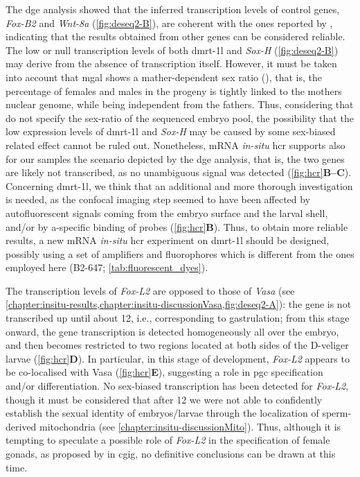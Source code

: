 The \gls{dge} analysis showed that the inferred transcription levels of control genes, \textit{Fox-B2} and \textit{Wnt-8a} (\cref{fig:deseq2-B}), are coherent with the ones reported by , indicating that the results obtained from other genes can be considered reliable. The low or null transcription levels of both \gls{dmrt-1l} and \textit{Sox-H} (\cref{fig:deseq2-B}) may derive from the absence of transcription itself. However, it must be taken into account that \gls{mgal} shows a mather-dependent sex ratio (), that is, the percentage of females and males in the progeny is tightly linked to the mother\curlyapostrophe s nuclear genome, while being independent from the father\curlyapostrophe s. Thus, considering that  do not specify the sex-ratio of the sequenced embryo pool, the possibility that the low expression levels of \gls{dmrt-1l} and \textit{Sox-H} may be caused by some sex-biased related effect cannot be ruled out. Nonetheless, mRNA \textit{in-situ} \gls{hcr} supports also for our samples the scenario depicted by the \gls{dge} analysis, that is, the two genes are likely not transcribed, as no unambiguous signal was detected (\cref{fig:hcr}\textbf{B--C}). Concerning \gls{dmrt-1l}, we think that an additional and more thorough investigation is needed, as the confocal imaging step seemed to have been affected by autofluorescent signals coming from the embryo surface and the larval shell, and/or by a-specific binding  of probes (\cref{fig:hcr}\textbf{B}). Thus, to obtain more reliable results, a new mRNA \textit{in-situ} \gls{hcr} experiment on \gls{dmrt-1l} should be designed, possibly using a set of amplifiers and fluorophores which is different from the ones employed here (B2-647; \cref{tab:fluorescent_dyes}).

The transcription levels of \textit{Fox-L2} are opposed to those of \textit{Vasa} (see \cref{chapter:insitu-results,chapter:insitu-discussionVasa,fig:deseq2-A}): the gene is not transcribed up until about \qty{12}{\hpf}, i.e., corresponding to gastrulation; from this stage onward, the gene transcription is detected homogeneously all over the embryo, and then becomes restricted to two regions located at both sides of the D-veliger larvae (\cref{fig:hcr}\textbf{D}). In particular, in this stage of development, \textit{Fox-L2} appears to be co-localised with Vasa (\cref{fig:hcr}\textbf{E}), suggesting a role in \gls{pgc} specification and/or differentiation. No sex-biased transcription has been detected for \textit{Fox-L2}, though it must be considered that after \qty{12}{\hpf} we were not able to confidently establish the sexual identity of embryos/larvae through the localization of sperm-derived mitochondria (see \cref{chapter:insitu-discussionMito}). Thus, although it is tempting to speculate a possible role of \textit{Fox-L2} in the specification of female gonads, as proposed by  in \gls{cgig}, no definitive conclusions can be drawn at this time.

